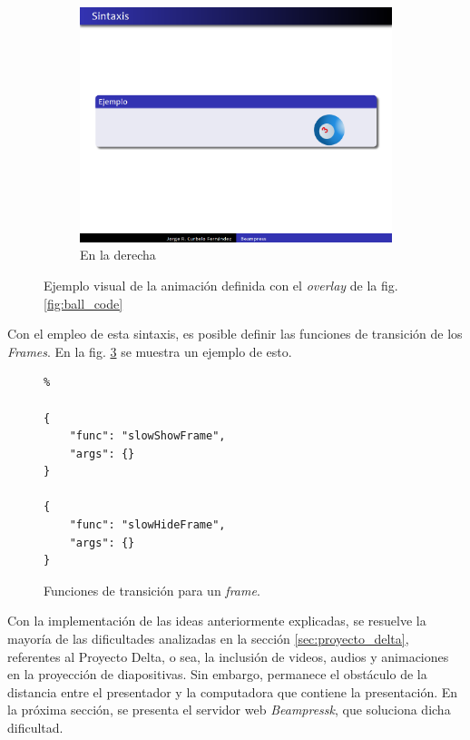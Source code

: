 \begin{figure}[tb]
\begin{subfigure}[b]{0.3\textwidth}
 				\includegraphics[width=\textwidth]{img/ball-right}
 				\caption{En la derecha}
 				\label{fig:ball_visual_c}	
 			\end{subfigure}	  			
 			\caption{Ejemplo visual de la animación definida con el \textit{overlay} de la fig. \ref{fig:ball_code}}
 			\label{fig:ball_visual} 
 		\end{figure}	


	Con el empleo de esta sintaxis, es posible definir las funciones de transición de los \textit{Frames}. En la fig. \ref{fig:frame_trans} se muestra un ejemplo de esto.

		\begin{figure}[htb]%
			\begin{lstlisting}%

{
    "func": "slowShowFrame",
    "args": {}
}

{
    "func": "slowHideFrame",
    "args": {}
}
			\end{lstlisting}
		\caption{
			Funciones de transición para un \textit{frame}. 
			\label{fig:frame_trans} }
		\end{figure}	

	

		Con la implementación de las ideas anteriormente explicadas, se resuelve la mayoría de las dificultades analizadas en la sección \ref{sec:proyecto_delta}, referentes al Proyecto Delta, o sea, la inclusión de videos, audios y animaciones en la proyección de diapositivas. Sin embargo, permanece el obstáculo de la distancia entre el presentador y la computadora que contiene la presentación. En la próxima sección, se presenta el servidor web \textit{Beampressk}, que soluciona dicha dificultad.

